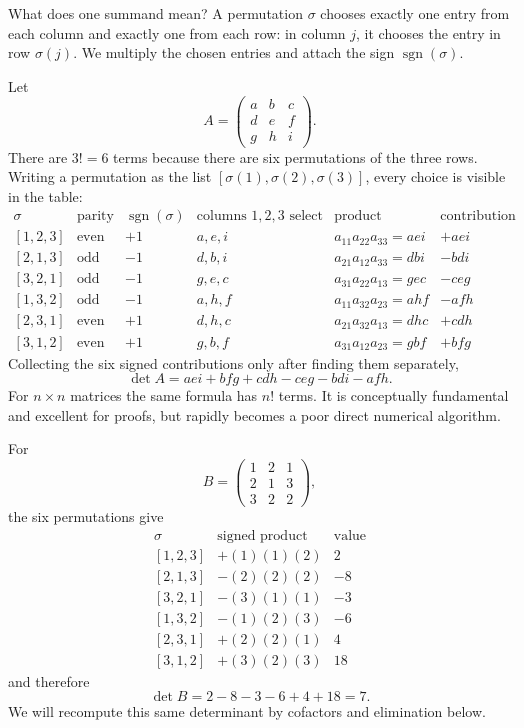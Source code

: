 What does one summand mean?  A permutation \(\sigma\) chooses exactly one
entry from each column and exactly one from each row: in column \(j\), it
chooses the entry in row \(\sigma(j)\).  We multiply the chosen entries and
attach the sign \(\operatorname{sgn}(\sigma)\).

\begin{example}
Let
\[
A=\begin{pmatrix}a&b&c\\d&e&f\\g&h&i\end{pmatrix}.
\]
There are \(3!=6\) terms because there are six permutations of the three
rows.  Writing a permutation as the list
\([\sigma(1),\sigma(2),\sigma(3)]\), every choice is visible in the table:
\begingroup\footnotesize
\[
\begin{array}{c|c|c|c|c|c}
\sigma&\text{parity}&\operatorname{sgn}(\sigma)&
\text{columns }1,2,3\text{ select}&\text{product}&\text{contribution}\\ \hline
{[1,2,3]}&\text{even}&+1&a,e,i&a_{11}a_{22}a_{33}=aei&+aei\\
{[2,1,3]}&\text{odd}&-1&d,b,i&a_{21}a_{12}a_{33}=dbi&-bdi\\
{[3,2,1]}&\text{odd}&-1&g,e,c&a_{31}a_{22}a_{13}=gec&-ceg\\
{[1,3,2]}&\text{odd}&-1&a,h,f&a_{11}a_{32}a_{23}=ahf&-afh\\
{[2,3,1]}&\text{even}&+1&d,h,c&a_{21}a_{32}a_{13}=dhc&+cdh\\
{[3,1,2]}&\text{even}&+1&g,b,f&a_{31}a_{12}a_{23}=gbf&+bfg
\end{array}
\]
\endgroup
Collecting the six signed contributions only after finding them separately,
\begin{equation}\label{eq:three-by-three-leibniz}
\det A=aei+bfg+cdh-ceg-bdi-afh.
\end{equation}
For \(n\times n\) matrices the same formula has \(n!\) terms.  It is
conceptually fundamental and excellent for proofs, but rapidly becomes a poor
direct numerical algorithm.
\end{example}

\begin{example}
For
\[
B=\begin{pmatrix}1&2&1\\2&1&3\\3&2&2\end{pmatrix},
\]
the six permutations give
\[
\begin{array}{c|c|c}
\sigma&\text{signed product}&\text{value}\\ \hline
{[1,2,3]}&+(1)(1)(2)&2\\
{[2,1,3]}&-(2)(2)(2)&-8\\
{[3,2,1]}&-(3)(1)(1)&-3\\
{[1,3,2]}&-(1)(2)(3)&-6\\
{[2,3,1]}&+(2)(2)(1)&4\\
{[3,1,2]}&+(3)(2)(3)&18
\end{array}
\]
and therefore
\[
\det B=2-8-3-6+4+18=7.
\]
We will recompute this same determinant by cofactors and elimination below.
\end{example}

